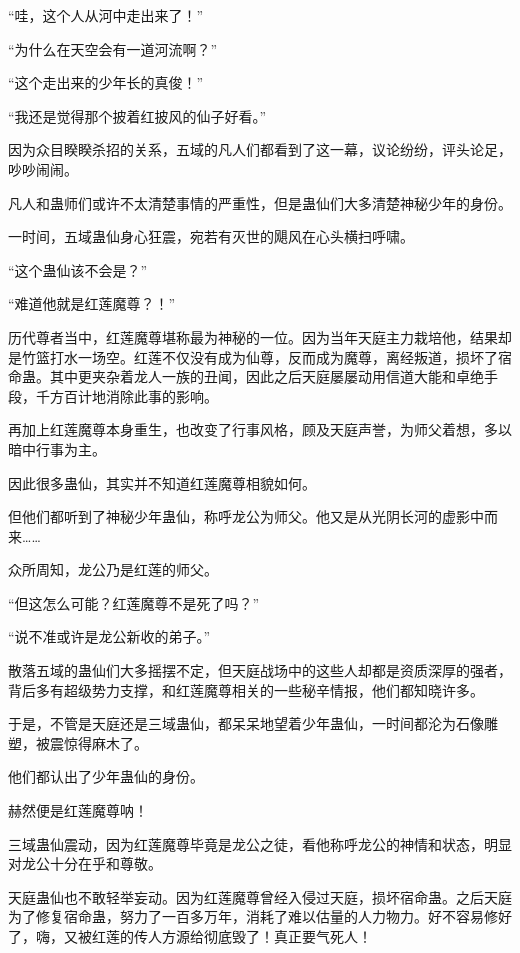 
\begin{this_body}

“哇，这个人从河中走出来了！”

“为什么在天空会有一道河流啊？”

“这个走出来的少年长的真俊！”

“我还是觉得那个披着红披风的仙子好看。”

因为众目睽睽杀招的关系，五域的凡人们都看到了这一幕，议论纷纷，评头论足，吵吵闹闹。

凡人和蛊师们或许不太清楚事情的严重性，但是蛊仙们大多清楚神秘少年的身份。

一时间，五域蛊仙身心狂震，宛若有灭世的飓风在心头横扫呼啸。

“这个蛊仙该不会是？”

“难道他就是红莲魔尊？！”

历代尊者当中，红莲魔尊堪称最为神秘的一位。因为当年天庭主力栽培他，结果却是竹篮打水一场空。红莲不仅没有成为仙尊，反而成为魔尊，离经叛道，损坏了宿命蛊。其中更夹杂着龙人一族的丑闻，因此之后天庭屡屡动用信道大能和卓绝手段，千方百计地消除此事的影响。

再加上红莲魔尊本身重生，也改变了行事风格，顾及天庭声誉，为师父着想，多以暗中行事为主。

因此很多蛊仙，其实并不知道红莲魔尊相貌如何。

但他们都听到了神秘少年蛊仙，称呼龙公为师父。他又是从光阴长河的虚影中而来……

众所周知，龙公乃是红莲的师父。

“但这怎么可能？红莲魔尊不是死了吗？”

“说不准或许是龙公新收的弟子。”

散落五域的蛊仙们大多摇摆不定，但天庭战场中的这些人却都是资质深厚的强者，背后多有超级势力支撑，和红莲魔尊相关的一些秘辛情报，他们都知晓许多。

于是，不管是天庭还是三域蛊仙，都呆呆地望着少年蛊仙，一时间都沦为石像雕塑，被震惊得麻木了。

他们都认出了少年蛊仙的身份。

赫然便是红莲魔尊呐！

三域蛊仙震动，因为红莲魔尊毕竟是龙公之徒，看他称呼龙公的神情和状态，明显对龙公十分在乎和尊敬。

天庭蛊仙也不敢轻举妄动。因为红莲魔尊曾经入侵过天庭，损坏宿命蛊。之后天庭为了修复宿命蛊，努力了一百多万年，消耗了难以估量的人力物力。好不容易修好了，嗨，又被红莲的传人方源给彻底毁了！真正要气死人！


\end{this_body}
